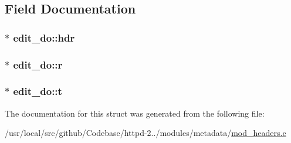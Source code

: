 \subsection{Field Documentation}
\subsubsection[{\texorpdfstring{hdr}{hdr}}]{$\ast$ edit\+\_\+do\+::hdr}\hypertarget{structedit__do_a6aeafd09b4fd3707c77367e79fbc5f89}{}\label{structedit__do_a6aeafd09b4fd3707c77367e79fbc5f89}
\subsubsection[{\texorpdfstring{r}{r}}]{$\ast$ edit\+\_\+do\+::r}\hypertarget{structedit__do_a2bc08457a6d3b02daa06712b66c31a92}{}\label{structedit__do_a2bc08457a6d3b02daa06712b66c31a92}
\subsubsection[{\texorpdfstring{t}{t}}]{$\ast$ edit\+\_\+do\+::t}\hypertarget{structedit__do_af07ebab25134d17adfd45d1073fd21f9}{}\label{structedit__do_af07ebab25134d17adfd45d1073fd21f9}


The documentation for this struct was generated from the following file\+:\begin{DoxyCompactItemize}
\item 
/usr/local/src/github/\+Codebase/httpd-\/2../modules/metadata/\hyperlink{mod__headers_8c}{mod\+\_\+headers.\+c}\end{DoxyCompactItemize}
